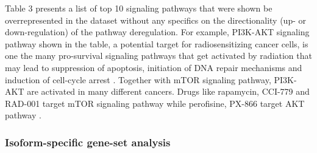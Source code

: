 \documentclass[hidelinks,11pt]{article}
\begin{document}
\begin{table}[ht]
\begin{center}
\label{table:design}
\end{center}
\caption{A list of top 10 over-represented KEGG pathways based on the functional enrichment of our DE gene list.}
\end{table} 

Table 3 presents a list of top 10 signaling pathways that were shown be overrepresented in the dataset without any specifics on the directionality (up- or down-regulation) of the pathway deregulation. For example, PI3K-AKT signaling pathway shown in the table, a potential target for radiosensitizing cancer cells, is one the many pro-survival signaling pathways that get activated by radiation that may lead to suppression of apoptosis, initiation of DNA repair mechanisms and induction of cell-cycle arrest \cite{pi3k}. Together with mTOR signaling pathway, PI3K-AKT are activated in many different cancers. Drugs like rapamycin, CCI-779 and RAD-001 target mTOR signaling pathway while perofisine, PX-866 target AKT pathway \cite{pi3k_drugs}.

\subsubsection*{Isoform-specific gene-set analysis}
\end{document}
